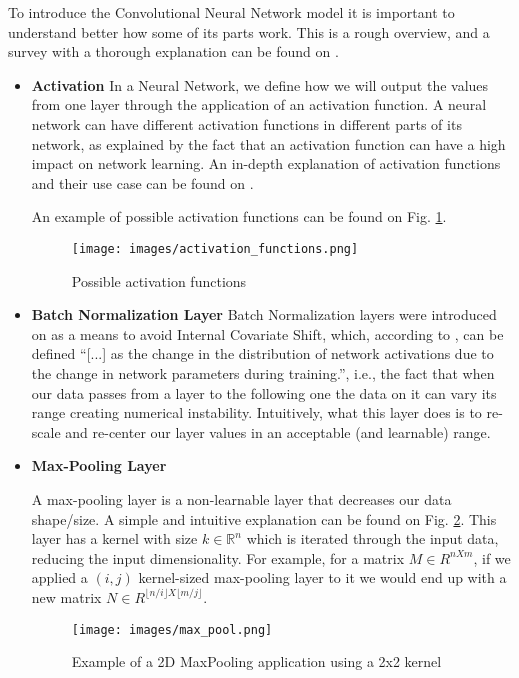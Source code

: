 \documentclass[conference]{IEEEtran}
\begin{document}
To introduce the Convolutional Neural Network model it is important to understand better how some of its parts work. This is a rough overview, and a survey with a thorough explanation can be found on \cite{b2}.

\begin{itemize}
\item \textbf{Activation} In a Neural Network, we define how we will output the values from one layer through the application of an activation function. A neural network can have different activation functions in different parts of its network, as explained by the fact that an activation function can have a high impact on network learning. An in-depth explanation of activation functions and their use case can be found on \cite{b4}.

An example of possible activation functions can be found on Fig. \ref{activation_functions}.

\begin{figure}[htbp]
\centerline{\texttt{[image: images/activation\_functions.png]}}
\caption{Possible activation functions \cite{b4}}
\label{activation_functions}
\end{figure}

\item \textbf{Batch Normalization Layer} Batch Normalization layers were introduced on \cite{b5} as a means to avoid Internal Covariate Shift, which, according to \cite{b5}, can be defined ``[...] as the change in the distribution of network activations due to the change in network parameters during training.'', i.e., the fact that when our data passes from a layer to the following one the data on it can vary its range creating numerical instability. Intuitively, what this layer does is to re-scale and re-center our layer values in an acceptable (and learnable) range.

\item \textbf{Max-Pooling Layer}

A max-pooling layer is a non-learnable layer that decreases our data shape/size. A simple and intuitive explanation can be found on Fig. \ref{max_pooling}. This layer has a kernel with size $k \in \mathbb{R}^n$ which is iterated through the input data, reducing the input dimensionality. For example, for a matrix $M \in R^{nXm} $, if we applied a $(i, j)$ kernel-sized max-pooling layer to it we would end up with a new matrix $N \in R^{\lfloor n/i\rfloor X \lfloor m/j\rfloor}$.

\begin{figure}[htbp]
\centerline{\texttt{[image: images/max\_pool.png]}}
\caption{Example of a 2D MaxPooling application using a 2x2 kernel \cite{b3}}
\label{max_pooling}
\end{figure}


\end{itemize}
\end{document}
